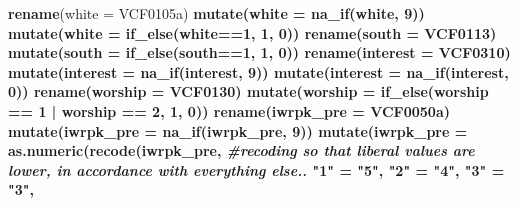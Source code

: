 \documentclass[
]{article}
\newenvironment{Shaded}{\begin{snugshade}}{\end{snugshade}}
\newcommand{\CommentTok}[1]{\textcolor[rgb]{0.56,0.35,0.01}{\textit{#1}}}
\newcommand{\DataTypeTok}[1]{\textcolor[rgb]{0.13,0.29,0.53}{#1}}
\newcommand{\DecValTok}[1]{\textcolor[rgb]{0.00,0.00,0.81}{#1}}
\newcommand{\KeywordTok}[1]{\textcolor[rgb]{0.13,0.29,0.53}{\textbf{#1}}}
\newcommand{\NormalTok}[1]{#1}
\newcommand{\OperatorTok}[1]{\textcolor[rgb]{0.81,0.36,0.00}{\textbf{#1}}}
\newcommand{\StringTok}[1]{\textcolor[rgb]{0.31,0.60,0.02}{#1}}
\begin{document}
\begin{Shaded}
\begin{Highlighting}[]
{{{{{{{{{{{{{{{{{{{{{{{{{{{{{{{{{{{{{{{{{{{{{{{{{{{{{\StringTok{    }\KeywordTok{rename}\NormalTok{(}\DataTypeTok{white =}\NormalTok{ VCF0105a)}\OperatorTok{%>%}
\StringTok{    }\KeywordTok{mutate}\NormalTok{(}\DataTypeTok{white =} \KeywordTok{na_if}\NormalTok{(white, }\DecValTok{9}\NormalTok{))}\OperatorTok{%>%}
\StringTok{    }\KeywordTok{mutate}\NormalTok{(}\DataTypeTok{white =} \KeywordTok{if_else}\NormalTok{(white}\OperatorTok{==}\DecValTok{1}\NormalTok{, }\DecValTok{1}\NormalTok{, }\DecValTok{0}\NormalTok{))}\OperatorTok{%>%}
\StringTok{    }\KeywordTok{rename}\NormalTok{(}\DataTypeTok{south =}\NormalTok{ VCF0113)}\OperatorTok{%>%}
\StringTok{    }\KeywordTok{mutate}\NormalTok{(}\DataTypeTok{south =} \KeywordTok{if_else}\NormalTok{(south}\OperatorTok{==}\DecValTok{1}\NormalTok{, }\DecValTok{1}\NormalTok{, }\DecValTok{0}\NormalTok{))}\OperatorTok{%>%}
\StringTok{    }\KeywordTok{rename}\NormalTok{(}\DataTypeTok{interest =}\NormalTok{ VCF0310)}\OperatorTok{%>%}
\StringTok{    }\KeywordTok{mutate}\NormalTok{(}\DataTypeTok{interest =} \KeywordTok{na_if}\NormalTok{(interest, }\DecValTok{9}\NormalTok{))}\OperatorTok{%>%}
\StringTok{    }\KeywordTok{mutate}\NormalTok{(}\DataTypeTok{interest =} \KeywordTok{na_if}\NormalTok{(interest, }\DecValTok{0}\NormalTok{))}\OperatorTok{%>%}
\StringTok{    }\KeywordTok{rename}\NormalTok{(}\DataTypeTok{worship =}\NormalTok{ VCF0130)}\OperatorTok{%>%}
\StringTok{    }\KeywordTok{mutate}\NormalTok{(}\DataTypeTok{worship =} \KeywordTok{if_else}\NormalTok{(worship }\OperatorTok{==}\StringTok{ }\DecValTok{1} \OperatorTok{|}\StringTok{ }\NormalTok{worship }\OperatorTok{==}\StringTok{ }\DecValTok{2}\NormalTok{, }\DecValTok{1}\NormalTok{, }\DecValTok{0}\NormalTok{))}\OperatorTok{%>%}
\StringTok{    }\KeywordTok{rename}\NormalTok{(}\DataTypeTok{iwrpk_pre =}\NormalTok{ VCF0050a)}\OperatorTok{%>%}
\StringTok{    }\KeywordTok{mutate}\NormalTok{(}\DataTypeTok{iwrpk_pre =} \KeywordTok{na_if}\NormalTok{(iwrpk_pre, }\DecValTok{9}\NormalTok{))}\OperatorTok{%>%}
\StringTok{    }\KeywordTok{mutate}\NormalTok{(}\DataTypeTok{iwrpk_pre =} \KeywordTok{as.numeric}\NormalTok{(}\KeywordTok{recode}\NormalTok{(iwrpk_pre, }\CommentTok{#recoding so that liberal values are lower, in accordance with everything else..}
                                                                            \StringTok{"1"}\NormalTok{ =}\StringTok{ "5"}\NormalTok{,}
                                                                            \StringTok{"2"}\NormalTok{ =}\StringTok{ "4"}\NormalTok{,}
                                                                            \StringTok{"3"}\NormalTok{ =}\StringTok{ "3"}\NormalTok{,}
}}}}}}}}}}}}}}}}}}}}}}}}}}}}}}}}}}}}}}}}}}}}}}}}}}}}}}}}}}}}}}}}}
\end{Highlighting}
\end{Shaded}
\end{document}
